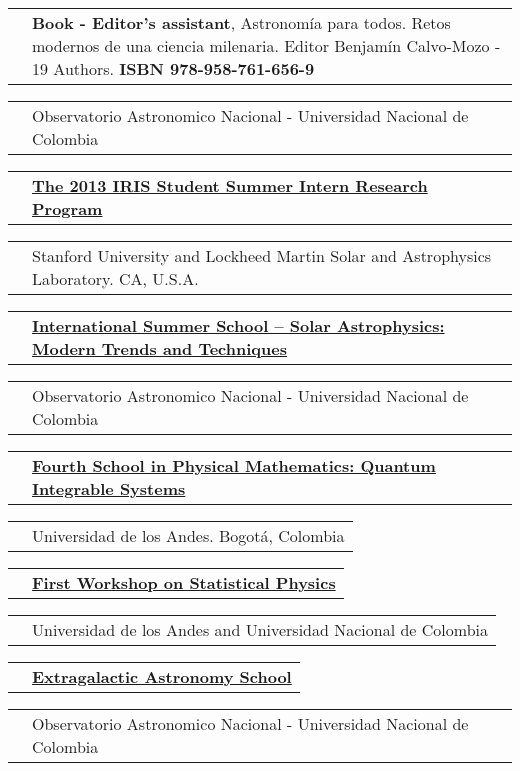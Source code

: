 \documentclass[11pt,letterpaper,sans]{moderncv}        %
\makeatletter
\renewcommand*{\cvitem}[3][.25em]{%
  \begin{tabular}{@{}p{\hintscolumnwidth}@{\hspace{\separatorcolumnwidth}}p{\maincolumnwidth}@{}}%
      \raggedleft\hintstyle{#2} &{#3}%
  \end{tabular}%
  \par\addvspace{#1}}
\makeatother
\begin{document}
\newpage
\cvitem{2013 - 2014}{\textbf{Book - Editor's assistant}, Astronom\'{i}a para todos. Retos modernos de una ciencia milenaria. Editor Benjam\'{i}n Calvo-Mozo - 19 Authors. \textbf{ISBN 978-958-761-656-9}}
\cvitem{}{Observatorio Astronomico Nacional - Universidad Nacional de Colombia}
\cvitem{Jun 24-Aug 30, 2013}{\href{http://solar-center.stanford.edu/IRIS/SummerProgram/}{\textbf{The 2013 IRIS Student Summer Intern Research Program}}}
\cvitem{}{Stanford University and Lockheed Martin Solar and Astrophysics Laboratory. CA, U.S.A.}
\cvitem{Jul 2 - 21, 2012}{\href{http://www.observatorio.unal.edu.co/eventos/solarschool/}{\textbf{International Summer School – Solar Astrophysics: Modern Trends and Techniques}}}
\cvitem{}{Observatorio Astronomico Nacional - Universidad Nacional de Colombia}
\cvitem{May 28 - 1, 2012}{\href{http://matematicas.uniandes.edu.co/~cursillo_gr/escuela2012/}{\textbf{Fourth School in Physical Mathematics: Quantum Integrable Systems}}}
\cvitem{}{Universidad de los Andes. Bogot\'a, Colombia}
\cvitem{Sept 12 - 16, 2011}{\href{http://www.ciencias.unal.edu.co/workshopstatisticalphysics/}{\textbf{First Workshop on Statistical Physics}}}
\cvitem{}{Universidad de los Andes and Universidad Nacional de Colombia}
\cvitem{Aug 9 - 11, 2010}{\href{http://www.observatorio.unal.edu.co/eventos/pasados/cocoa/escuela.html}{\textbf{Extragalactic Astronomy School}}}
\cvitem{}{Observatorio Astronomico Nacional - Universidad Nacional de Colombia}
\end{document}
